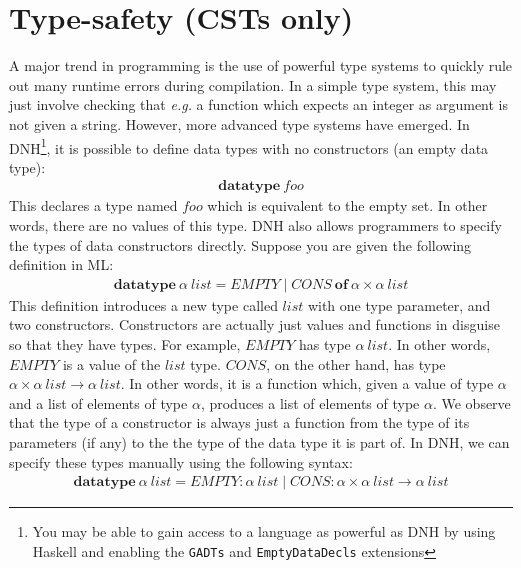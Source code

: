 
\section{Type-safety (CSTs only)}

\question[5] A major trend in programming is the use of powerful type systems to quickly rule out many runtime errors during compilation. In a simple type system, this may just involve checking that \emph{e.g.} a function which expects an integer as argument is not given a string. However, more advanced type systems have emerged. In DNH\footnote{You may be able to gain access to a language as powerful as DNH by using Haskell and enabling the \texttt{GADTs} and \texttt{EmptyDataDecls} extensions}, it is possible to define data types with no constructors (an empty data type):
\begin{displaymath}
\begin{array}{l}
\mathbf{datatype}~\mathit{foo}
\end{array}
\end{displaymath}
This declares a type named $\mathit{foo}$ which is equivalent to the empty set. In other words, there are no values of this type. DNH also allows programmers to specify the types of data constructors directly. Suppose you are given the following definition in ML:
\begin{displaymath}
\begin{array}{l}
\mathbf{datatype}~\alpha~\mathit{list} = \mathit{EMPTY} \mid \mathit{CONS}~\mathbf{of}~\alpha \times \alpha~\mathit{list}
\end{array}
\end{displaymath}
This definition introduces a new type called $\mathit{list}$ with one type parameter, and two constructors. Constructors are actually just values and functions in disguise so that they have types. For example, $\mathit{EMPTY}$ has type $\alpha~\mathit{list}$. In other words, $\mathit{EMPTY}$ is a value of the $\mathit{list}$ type. $\mathit{CONS}$, on the other hand, has type $\alpha \times \alpha~\mathit{list} \to \alpha~\mathit{list}$. In other words, it is a function which, given a value of type $\alpha$ and a list of elements of type $\alpha$, produces a list of elements of type $\alpha$. We observe that the type of a constructor is always just a function from the type of its parameters (if any) to the the type of the data type it is part of. In DNH, we can specify these types manually using the following syntax:
\begin{displaymath}
\begin{array}{l}
\mathbf{datatype}~\alpha~\mathit{list} = \mathit{EMPTY} : \alpha~\mathit{list} \mid \mathit{CONS} : \alpha \times \alpha~\mathit{list} \to \alpha~\mathit{list}
\end{array}
\end{displaymath}
